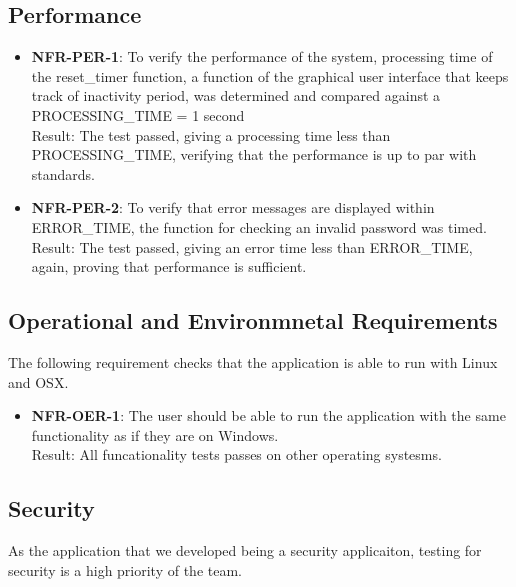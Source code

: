 \documentclass[12pt, titlepage]{article}
\begin{document}
	\subsection{Performance}

		\begin{itemize}

			\item \textbf{NFR-PER-1}: To verify the performance of the system, processing time of the reset\_timer function, a function of the graphical user interface that keeps track of inactivity period, was determined and compared against a PROCESSING\_TIME = 1 second\\
			Result: The test passed, giving a processing time less than PROCESSING\_TIME, verifying that the performance is up to par with standards.

			\item \textbf{NFR-PER-2}: To verify that error messages are displayed within ERROR\_TIME, the function for checking an invalid password was timed.\\
			Result: The test passed, giving an error time less than ERROR\_TIME, again, proving that performance is sufficient.

		\end{itemize}

	\subsection{Operational and Environmnetal Requirements}
		The following requirement checks that the application is able to run with Linux and OSX.

		\begin{itemize}
			
			\item \textbf{NFR-OER-1}: The user should be able to run the application with the same functionality as if they are on Windows.\\
			Result: All funcationality tests passes on other operating systesms. 

		\end{itemize}

	\subsection{Security}
		As the application that we developed being a security applicaiton, testing for security is a high priority of the team.
	
\end{document}
